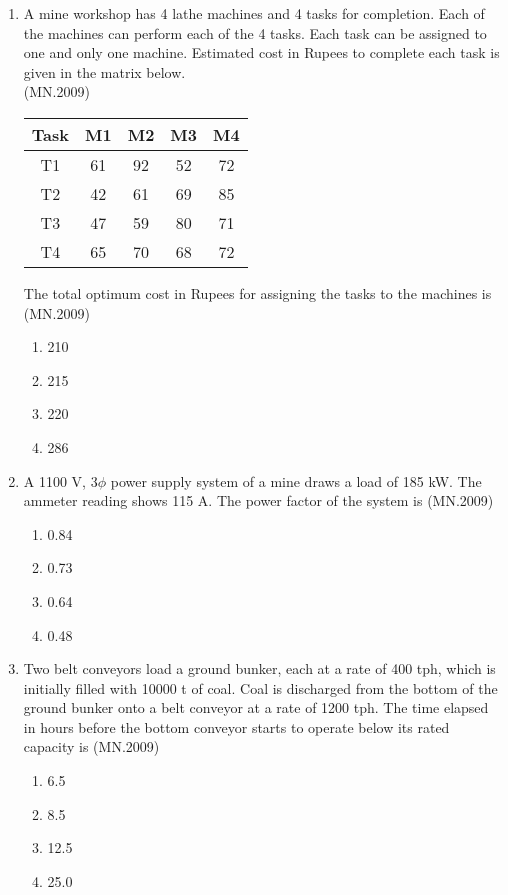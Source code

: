 \documentclass[journal]{IEEEtran}
\numberwithin{equation}{enumi}
\numberwithin{figure}{enumi}
\begin{document}
\begin{enumerate}
\item A mine workshop has 4 lathe machines and 4 tasks for completion. Each of the machines can perform each of the 4 tasks. Each task can be assigned to one and only one machine. Estimated cost in Rupees to complete each task is given in the matrix below.\\
\hfill{(MN.2009)}
\begin{center}
\begin{tabular}{|c|c|c|c|c|}
\hline
\textbf{Task} & \textbf{M1} & \textbf{M2} & \textbf{M3} & \textbf{M4} \\
\hline
T1 & 61 & 92 & 52 & 72 \\
T2 & 42 & 61 & 69 & 85 \\
T3 & 47 & 59 & 80 & 71 \\
T4 & 65 & 70 & 68 & 72 \\
\hline
\end{tabular}
\end{center}


The total optimum cost in Rupees for assigning the tasks to the machines is
\hfill{(MN.2009)}
\begin{enumerate}[label=(\Alph*)]
\item 210
\item 215
\item 220
\item 286
\end{enumerate}
\item A 1100 V, 3$\phi$ power supply system of a mine draws a load of 185 kW. The ammeter reading shows 115 A. The power factor of the system is
\hfill{(MN.2009)}
\begin{enumerate}[label=(\Alph*)]
\item 0.84
\item 0.73
\item 0.64
\item 0.48
\end{enumerate}

\item Two belt conveyors load a ground bunker, each at a rate of 400 tph, which is initially filled with 10000 t of coal. Coal is discharged from the bottom of the ground bunker onto a belt conveyor at a rate of 1200 tph. The time elapsed in hours before the bottom conveyor starts to operate below its rated capacity is
\hfill{(MN.2009)}
\begin{enumerate}[label=(\Alph*)]
\item 6.5
\item 8.5
\item 12.5
\item 25.0
\end{enumerate}


\end{enumerate}
\end{document}
